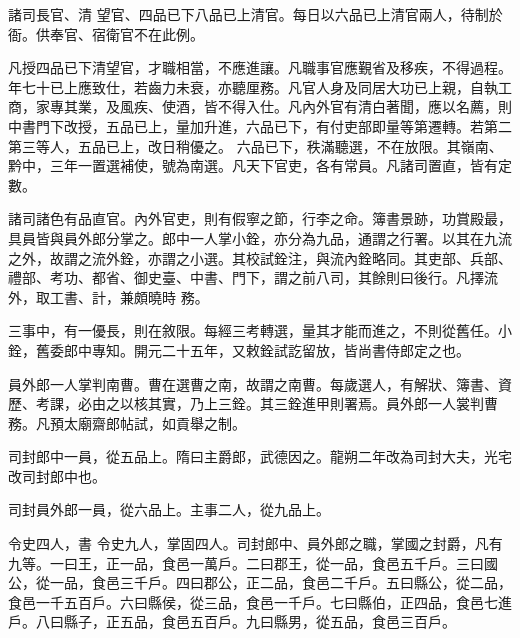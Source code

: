 \begin{pinyinscope}
 諸司長官、清
 望官、四品已下八品已上清官。每日以六品已上清官兩人，待制於衙。供奉官、宿衛官不在此例。



 凡授四品已下清望官，才職相當，不應進讓。凡職事官應覲省及移疾，不得過程。年七十已上應致仕，若齒力未衰，亦聽厘務。凡官人身及同居大功已上親，自執工商，家專其業，及風疾、使酒，皆不得入仕。凡內外官有清白著聞，應以名薦，則中書門下改授，五品已上，量加升進，六品已下，有付吏部即量等第遷轉。若第二第三等人，五品已上，改日稍優之。
 六品已下，秩滿聽選，不在放限。其嶺南、黔中，三年一置選補使，號為南選。凡天下官吏，各有常員。凡諸司置直，皆有定數。



 諸司諸色有品直官。內外官吏，則有假寧之節，行李之命。簿書景跡，功賞殿最，具員皆與員外郎分掌之。郎中一人掌小銓，亦分為九品，通謂之行署。以其在九流之外，故謂之流外銓，亦謂之小選。其校試銓注，與流內銓略同。其吏部、兵部、禮部、考功、都省、御史臺、中書、門下，謂之前八司，其餘則曰後行。凡擇流外，取工書、計，兼頗曉時
 務。



 三事中，有一優長，則在敘限。每經三考轉選，量其才能而進之，不則從舊任。小銓，舊委郎中專知。開元二十五年，又敕銓試訖留放，皆尚書侍郎定之也。



 員外郎一人掌判南曹。曹在選曹之南，故謂之南曹。每歲選人，有解狀、簿書、資歷、考課，必由之以核其實，乃上三銓。其三銓進甲則署焉。員外郎一人裳判曹務。凡預太廟齋郎帖試，如貢舉之制。



 司封郎中一員，從五品上。隋曰主爵郎，武德因之。龍朔二年改為司封大夫，光宅改司封郎中也。



 司封員外郎一員，從六品上。主事二人，從九品上。



 令史四人，書
 令史九人，掌固四人。司封郎中、員外郎之職，掌國之封爵，凡有九等。一曰王，正一品，食邑一萬戶。二曰郡王，從一品，食邑五千戶。三曰國公，從一品，食邑三千戶。四曰郡公，正二品，食邑二千戶。五曰縣公，從二品，食邑一千五百戶。六曰縣侯，從三品，食邑一千戶。七曰縣伯，正四品，食邑七進戶。八曰縣子，正五品，食邑五百戶。九曰縣男，從五品，食邑三百戶。




\end{pinyinscope}
